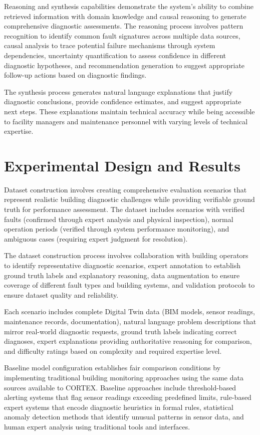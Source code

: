 Reasoning and synthesis capabilities demonstrate the system's ability to combine retrieved information with domain knowledge and causal reasoning to generate comprehensive diagnostic assessments. The reasoning process involves pattern recognition to identify common fault signatures across multiple data sources, causal analysis to trace potential failure mechanisms through system dependencies, uncertainty quantification to assess confidence in different diagnostic hypotheses, and recommendation generation to suggest appropriate follow-up actions based on diagnostic findings.

The synthesis process generates natural language explanations that justify diagnostic conclusions, provide confidence estimates, and suggest appropriate next steps. These explanations maintain technical accuracy while being accessible to facility managers and maintenance personnel with varying levels of technical expertise.

\section{Experimental Design and Results}

Dataset construction involves creating comprehensive evaluation scenarios that represent realistic building diagnostic challenges while providing verifiable ground truth for performance assessment. The dataset includes scenarios with verified faults (confirmed through expert analysis and physical inspection), normal operation periods (verified through system performance monitoring), and ambiguous cases (requiring expert judgment for resolution).

The dataset construction process involves collaboration with building operators to identify representative diagnostic scenarios, expert annotation to establish ground truth labels and explanatory reasoning, data augmentation to ensure coverage of different fault types and building systems, and validation protocols to ensure dataset quality and reliability.

Each scenario includes complete Digital Twin data (BIM models, sensor readings, maintenance records, documentation), natural language problem descriptions that mirror real-world diagnostic requests, ground truth labels indicating correct diagnoses, expert explanations providing authoritative reasoning for comparison, and difficulty ratings based on complexity and required expertise level.

Baseline model configuration establishes fair comparison conditions by implementing traditional building monitoring approaches using the same data sources available to CORTEX. Baseline approaches include threshold-based alerting systems that flag sensor readings exceeding predefined limits, rule-based expert systems that encode diagnostic heuristics in formal rules, statistical anomaly detection methods that identify unusual patterns in sensor data, and human expert analysis using traditional tools and interfaces.

